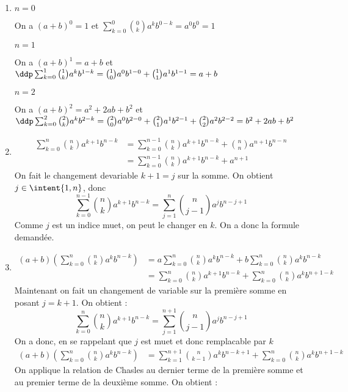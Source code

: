 \documentclass[a4paper, 11pt,reqno]{article}
\begin{document}
\begin{correction}





\begin{enumerate}
\item $n=0$

On a 
$(a+b)^0 =1$ et 
$\sum_{k=0}^0 \binom{0}{k}a^k b^{0-k} = a^0b^0=1$

 $n=1$

On a 
$(a+b)^1 =a+b$ et 
$\ddp \sum_{k=0}^1 \binom{1}{k}a^k b^{1-k} = \binom{1}{0}a^0 b^{1-0}+\binom{1}{1}a^1 b^{1-1}= a+b$


 $n=2$

On a 
$(a+b)^2 =a^2+2ab+b^2$ et 
$\ddp \sum_{k=0}^2 \binom{2}{k}a^k b^{2-k} = \binom{2}{0}a^0 b^{2-0}+\binom{2}{1}a^1 b^{2-1}+\binom{2}{2}a^2 b^{2-2} =b^2+2ab+b^2$







\item 
\begin{align*}
\sum_{k=0}^n \binom{n}{k}a^{k+1} b^{n-k}  &= \sum_{k=0}^{n-1} \binom{n}{k}a^{k+1} b^{n-k}  + \binom{n}{n}a^{n+1} b^{n-n} \\
&= \sum_{k=0}^{n-1} \binom{n}{k}a^{k+1} b^{n-k}  + a^{n+1} 
\end{align*}
On fait le changement devariable $k+1=j$ sur la somme. On obtient 
$j\in \intent{1,n}$, donc 
$$\sum_{k=0}^{n-1} \binom{n}{k}a^{k+1} b^{n-k}  = \sum_{j=1}^{n} \binom{n}{j-1}a^{j} b^{n-j+1} $$
Comme $j$ est un indice muet, on peut le changer en $k$. On a donc la formule demandée.

\item 
\begin{align*}
(a+b)\left( \sum_{k=0}^n \binom{n}{k}a^k b^{n-k}\right) &=a  \sum_{k=0}^n \binom{n}{k}a^k b^{n-k} +b\sum_{k=0}^n \binom{n}{k}a^k b^{n-k}\\
&= \sum_{k=0}^n \binom{n}{k}a^{k+1} b^{n-k} +\sum_{k=0}^n \binom{n}{k}a^k b^{n+1-k} 
\end{align*}
Maintenant on fait un changement de variable sur la première somme en posant $j =k+1$. On obtient : 
$$ \sum_{k=0}^n \binom{n}{k}a^{k+1} b^{n-k}= \sum_{j=1}^{n+1} \binom{n}{j-1}a^{j} b^{n-j+1}$$
On a donc, en se rappelant que $j$ est muet et donc remplacable par $k$
\begin{align*}
(a+b)\left( \sum_{k=0}^n \binom{n}{k}a^k b^{n-k}\right) &= \sum_{k=1}^{n+1} \binom{n}{k-1}a^{k} b^{n-k+1}+ \sum_{k=0}^{n} \binom{n}{k}a^{k} b^{n+1-k}
\end{align*}
On applique la relation de Chasles au  dernier terme de la première somme et au premier terme de la deuxième somme. On obtient : 


\end{enumerate}
\end{correction}
\end{document}
